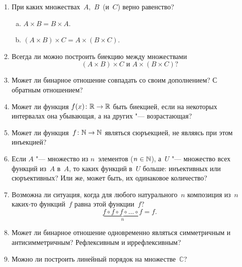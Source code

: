 \begin{enumerate}%
  \item При каких множествах~$A$,~$B$~(и~$C$) верно равенство?
    \begin{enumerate}[a)]%
      \item $ A \times B = B \times A $.
      \item $ (A \times B) \times C = A \times (B \times C) $.
    \end{enumerate}

  \item Всегда ли можно построить биекцию между множествами
    \[
      (A \times B) \times C \text{ и } A \times (B \times C)?
    \]

  \item Может ли бинарное отношение совпадать со своим дополнением? С обратным отношением?
  
  \item Может ли функция $ f(x)\colon \mathbb R \to \mathbb R $ быть биекцией,
    если на некоторых интервалах она убывающая, а на других "--- возрастающая?

  \item Может ли функция~$ f\colon \mathbb N \to \mathbb N $ являться сюръекцией,
    не являясь при этом инъекцией? 

  \item Если $A$ "--- множество из $n$~элементов ($ n \in \mathbb N $), 
    а~$U$ "--- множество всех функций из~$A$ в~$A$,
    то каких функций в~$U$ больше: инъективных или сюръективных?
    Или же, может быть, их одинаковое количество?

  \item Возможна ли ситуация, когда для любого натурального~$n$ композиция из~$n$ каких-то функций~$f$ равна этой функции~$f$?
    \[
      \underbrace{f \circ f \circ f \circ \ldots \circ f}_{n} = f.
    \]
  
  \item Может ли бинарное отношение одновременно являться симметричным и антисимметричным?
    Рефлексивным и иррефлексивным?

  \item Можно ли построить линейный порядок на множестве~$\mathbb C$?
\end{enumerate}